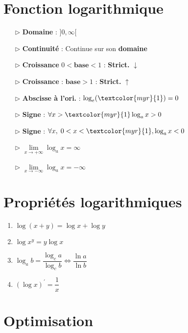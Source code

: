 \documentclass{report}
\begin{document}
\begin{multicols*}{3}
\begin{enumerate}
        \end{enumerate}



    \section{Fonction logarithmique}
    \begin{itemize}
        \item[$\rhd$ ] \textbf{Domaine} : $]0, \infty [$  
        \item[$\rhd$ ] \textbf{Continuité} : Continue sur son \textbf{domaine} 
        \item[$\rhd$ ] \textbf{Croissance}  $0 < \textbf{base} < 1$ : 
            \textcolor{myr}{\textbf{Strict.}} $\downarrow$

        \item[$\rhd$ ] \textbf{Croissance} : $\textbf{base}> 1$ : \textcolor{myr}{\textbf{Strict.}} $\uparrow$
        \item[$\rhd$ ] \textbf{Abscisse à l'ori.} : $\log_e(\textcolor{myr}{1}) = 0$ 
        \item[$\rhd$ ] \textbf{Signe} : $\forall x > \textcolor{myr}{1} \log_ax > 0$
        \item[$\rhd$ ] \textbf{Signe} : $\forall x, \; 0 < x < \textcolor{myr}{1}, \log_ax < 0$  
        \item[$\rhd$ ] $\lim\limits_{x\to+\infty}\log_ax  = \infty$  
        \item[$\rhd$ ] $\lim\limits_{x\to-\infty}\log_ax  = -\infty$
    \end{itemize}


\section{Propriétés logarithmiques}  
        \begin{enumerate}
            \item $\log(x+y) = \log x + \log y$
            \item $\log x^y = y\log x$ 
            \item  $\log_a b = \dfrac{\log_c a}{\log_c b} 
                \Leftrightarrow
                \dfrac{\ln a}{\ln b}$
            \item $(\log x)^{\prime} = \dfrac{1}{x}$
        \end{enumerate}



    \section{Optimisation}


\end{multicols*}
\end{document}
